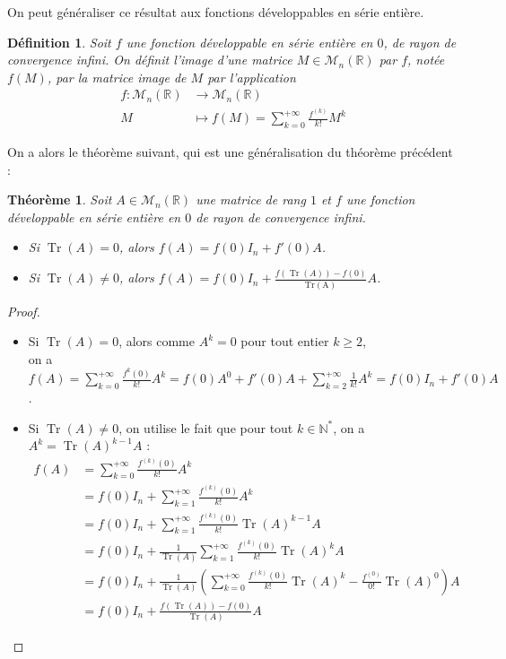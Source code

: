 \documentclass[a4paper]{article}
\newtheorem*{theorem}{Théorème}
\newtheorem*{definition}{Définition}
\begin{document}
On peut généraliser ce résultat aux fonctions développables en série entière.

\begin{definition}
    Soit $f$ une fonction développable en série entière en $0$, de rayon de convergence infini. On définit l'image d'une matrice $M \in \mathcal{M}_{n}(\mathbb{R})$ par $f$, notée $f(M)$, par la matrice image de $M$ par l'application
    \begin{align*}
    f : \mathcal{M}_{n}(\mathbb{R}) &\longrightarrow \mathcal{M}_{n}(\mathbb{R})\\
    M &\longmapsto f(M) = \sum_{k=0}^{+\infty} \frac{f^{(k)}}{k!}M^k
    \end{align*}
\end{definition}

On a alors le théorème suivant, qui est une généralisation du théorème précédent :

\begin{theorem}
    Soit $A \in \mathcal{M}_{n}(\mathbb{R})$ une matrice de rang $1$ et $f$ une fonction développable en série entière en $0$ de rayon de convergence infini.
    \begin{itemize}
        \item Si $\operatorname{Tr}(A) = 0$, alors $f(A) = f(0) I_n + f'(0) A$.
        \item Si $\operatorname{Tr}(A) \neq 0$, alors $\displaystyle f(A) = f(0) I_n + \frac{f(\operatorname{Tr}(A))-f(0)}{\operatorname{Tr(A)}} A$.
    \end{itemize}
\end{theorem}

\begin{proof}
    \begin{itemize}
        \item Si $\operatorname{Tr}(A) = 0$, alors comme $A^k = 0$ pour tout entier $k \geq 2$,\\ on a $\displaystyle f(A) = \sum_{k=0}^{+\infty} \frac{f^{k}(0)}{k!}A^k = f(0) A^0 + f'(0) A + \sum_{k=2}^{+\infty} \frac{1}{k!}A^k = f(0) I_n + f'(0) A$.
        \item Si $\operatorname{Tr}(A) \neq 0$, on utilise le fait que pour tout $k \in \mathbb{N}^*$, on a $A^k = \operatorname{Tr}(A)^{k-1}A$ :
    \begin{align*}
        f(A) &= \sum_{k=0}^{+\infty} \frac{f^{(k)}(0)}{k!} A^k \\
        &= f(0) I_n + \sum_{k=1}^{+\infty} \frac{f^{(k)}(0)}{k!} A^k \\
        &= f(0) I_n + \sum_{k=1}^{+\infty} \frac{f^{(k)}(0)}{k!} \operatorname{Tr}(A)^{k-1}A\\
        &= f(0) I_n + \frac{1}{\operatorname{Tr}(A)}\sum_{k=1}^{+\infty} \frac{f^{(k)}(0)}{k!} \operatorname{Tr}(A)^k A \\
        &= f(0) I_n + \frac{1}{\operatorname{Tr}(A)} \left(\sum_{k=0}^{+\infty} \frac{f^{(k)}(0)}{k!} \operatorname{Tr}(A)^k - \frac{f^{(0)}}{0!}\operatorname{Tr}(A)^0\right)A \\
        &= f(0) I_n + \frac{f(\operatorname{Tr}(A))-f(0)}{\operatorname{Tr}(A)}A
    \end{align*}
    \end{itemize}
\end{proof}
\end{document}
